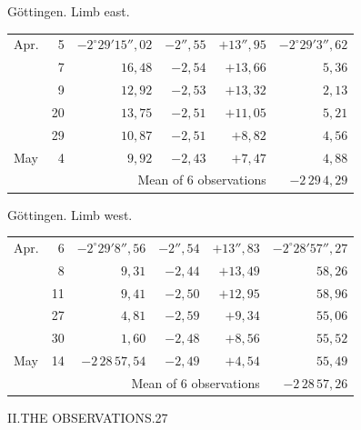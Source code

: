 \noindent\begin{minipage}[t]{.495\textwidth}\centering Göttingen. Limb east.\par\smallskip
{\scriptsize\setlength{\tabcolsep}{1pt}\renewcommand{\arraystretch}{1.2}\begin{tabular}{lr|r|r|r|r|}
Apr.&5&$-2^\circ29'15''{,}02$&$-2''{,}55$&$+13''{,}95$&$-2^\circ29'3''{,}62$\\
&7&$16{,}48$&$-2{,}54$&$+13{,}66$&$5{,}36$\\
&9&$12{,}92$&$-2{,}53$&$+13{,}32$&$2{,}13$\\
&20&$13{,}75$&$-2{,}51$&$+11{,}05$&$5{,}21$\\
&29&$10{,}87$&$-2{,}51$&$+8{,}82$&$4{,}56$\\
May&4&$9{,}92$&$-2{,}43$&$+7{,}47$&$4{,}88$\\
\cline{6-6}\multicolumn{5}{r}{Mean of 6 observations}&$-2\,29\,4{,}29$
\end{tabular}}\end{minipage}\hfill\begin{minipage}[t]{.495\textwidth}\centering Göttingen. Limb west.\par\smallskip
{\scriptsize\setlength{\tabcolsep}{1pt}\renewcommand{\arraystretch}{1.2}\begin{tabular}{lr|r|r|r|r}
Apr.&6&$-2^\circ29'8''{,}56$&$-2''{,}54$&$+13''{,}83$&$-2^\circ28'57''{,}27$\\
&8&$9{,}31$&$-2{,}44$&$+13{,}49$&$58{,}26$\\
&11&$9{,}41$&$-2{,}50$&$+12{,}95$&$58{,}96$\\
&27&$4{,}81$&$-2{,}59$&$+9{,}34$&$55{,}06$\\
&30&$1{,}60$&$-2{,}48$&$+8{,}56$&$55{,}52$\\
May&14&$-2\,28\,57{,}54$&$-2{,}49$&$+4{,}54$&$55{,}49$\\
\cline{6-6}\multicolumn{5}{r}{Mean of 6 observations}&$-2\,28\,57{,}26$
\end{tabular}}\end{minipage}
\par\vspace{4mm}

\clearpage
\noindent\mbox{}\hfill II.\quad THE OBSERVATIONS.\hfill 27\par

